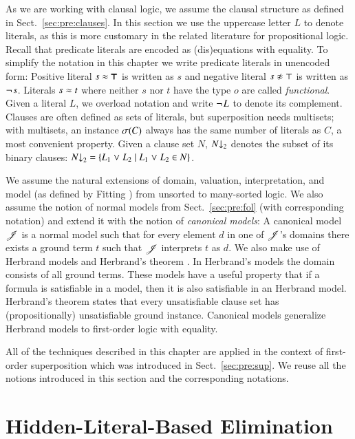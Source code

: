 As we are working with clausal logic, we assume the clausal structure as defined
in Sect.~\ref{sec:pre:clauses}. In this section we use the uppercase letter $L$
to denote literals, as this is more customary in the related literature for
propositional logic. Recall that predicate literals  are encoded as
(dis)equations with equality. To simplify the notation in this chapter we write
predicate literals in unencoded form: Positive literal $s \approx \pmb{\top}$ is
written as $s$ and negative literal $\neqlit{s}{\top}$ is written as
$\neg{\kern.2ex s}$. Literals $s \approx t$ where neither $s$ nor $t$ have the
type $o$ are called \emph{functional}. Given a literal $L$, we overload notation
and write $\neg{\kern.2ex L}$ to denote its complement. Clauses are often defined as
sets of literals, but superposition needs multisets; with multisets, an instance
$\sigma(C)$ always has the same number of literals as $C$, a most convenient
property. Given a clause set $N$, $N{\downarrow}_2$ denotes the subset of its binary
clauses: $N{\downarrow}_2 = \{ L_1 \mathrel{\lor} L_2 \mid L_1 \mathrel{\lor} L_2 \in N \}$.

We assume the natural extensions of domain, valuation, interpretation, and model
(as defined by Fitting \cite{mf-1996-fol}) from unsorted to many-sorted logic.
We also assume the notion of normal models from Sect.~\ref{sec:pre:fol} (with
corresponding notation) and extend it with the notion of \emph{canonical
models}: A canonical model $\mathscr{J}$ is a normal model such that for every
element $d$ in one of $\mathscr{J}$'s domains there exists a ground term $t$ such
that $\mathscr{J}$ interprets $t$ as $d$. 
We also make use of Herbrand models and Herbrand's theorem \cite[Sect.~5.4]{mf-1996-fol}.
In Herbrand's models the domain consists of all ground terms. These models have a 
useful property that if a formula is satisfiable in a model, then it is also satisfiable in an
Herbrand model. Herbrand's theorem states that every unsatisfiable clause set has (propositionally)
unsatisfiable ground instance.     
Canonical models generalize Herbrand models to first-order logic with equality.

All of the techniques described in this chapter are applied in the context of
first-order superposition which was introduced in Sect.~\ref{sec:pre:sup}. We
reuse all the notions introduced in this section and the corresponding notations. 

\section{Hidden-Literal-Based Elimination}
\label{sec:satfol:hidden-literal-based-elimination}

